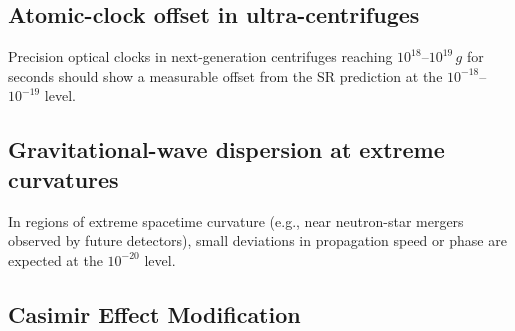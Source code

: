 \documentclass[11pt,letterpaper]{article}
\begin{document}
\subsection{Atomic-clock offset in ultra-centrifuges}  
Precision optical clocks in next-generation centrifuges reaching \(10^{18}\)–\(10^{19}\,g\) for seconds should show a measurable offset from the SR prediction at the \(10^{-18}\)–\(10^{-19}\) level.

\subsection{Gravitational-wave dispersion at extreme curvatures}  
In regions of extreme spacetime curvature (e.g., near neutron-star mergers observed by future detectors), small deviations in propagation speed or phase are expected at the \(10^{-20}\) level.

\subsection{Casimir Effect Modification}
\end{document}

